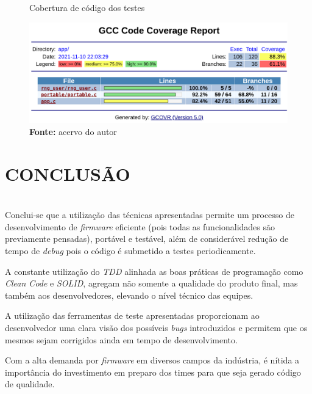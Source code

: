 \documentclass[times, twoside, watermark]{artigo}
\begin{document}
\begin{figure}[H]
  \centering
  \caption{Cobertura de código dos testes}
  \includegraphics[width=1\linewidth]{images/code-coverage-2.png}
  \caption*{\newline\textbf{Fonte:} acervo do autor}
  \label{fig:code-coverage}
\end{figure}


\section{CONCLUSÃO}\hfill\\
Conclui-se que a utilização das técnicas apresentadas permite um processo de
desenvolvimento de \textit{firmware} eficiente (pois todas as funcionalidades são
previamente pensadas), portável e testável, além de considerável redução de tempo de
\textit{debug} pois o código é submetido a testes periodicamente.

A constante utilização do \textit{TDD} alinhada as boas práticas de programação
como \textit{Clean Code} e \textit{SOLID}, agregam não somente a qualidade
do produto final, mas também aos desenvolvedores, elevando o nível técnico 
das equipes.

A utilização das ferramentas de teste apresentadas proporcionam ao desenvolvedor
uma clara visão dos possíveis \textit{bugs} introduzidos e permitem que os mesmos
sejam corrigidos ainda em tempo de desenvolvimento.

Com a alta demanda por \textit{firmware} em diversos campos da indústria, é nítida
a importância do investimento em preparo dos times para que seja gerado código 
de qualidade.



\end{document}
